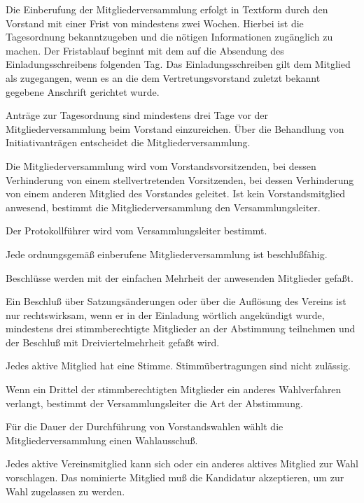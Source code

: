 \documentclass[draft]{scrartcl}
\begin{document}
\begin{contract}

Die Einberufung der Mitgliederversammlung erfolgt in Textform durch den
Vorstand mit einer Frist von mindestens zwei Wochen. Hierbei ist die
Tagesordnung bekanntzugeben und die nötigen Informationen zugänglich zu
machen. Der Fristablauf beginnt mit dem auf die Absendung des
Einladungsschreibens folgenden Tag. Das Einladungsschreiben gilt dem Mitglied
als zugegangen, wenn es an die dem Vertretungsvorstand zuletzt bekannt
gegebene Anschrift gerichtet wurde.

Anträge zur Tagesordnung sind mindestens drei Tage vor der
Mitgliederversammlung beim Vorstand einzureichen. Über die Behandlung von
Initiativanträgen entscheidet die Mitgliederversammlung.


Die Mitgliederversammlung wird vom Vorstandsvorsitzenden, bei dessen
Verhinderung von einem stellvertretenden Vorsitzenden, bei dessen Verhinderung
von einem anderen Mitglied des Vorstandes geleitet. Ist kein Vorstandsmitglied
anwesend, bestimmt die Mitgliederversammlung den Versammlungsleiter.

Der Protokollführer wird vom Versammlungsleiter bestimmt.


Jede ordnungsgemäß einberufene Mitgliederversammlung ist beschlußfähig.

Beschlüsse werden mit der einfachen Mehrheit der anwesenden Mitglieder gefaßt.

Ein Beschluß über Satzungsänderungen oder über die Auflösung des Vereins ist
nur rechtswirksam, wenn er in der Einladung wörtlich angekündigt wurde,
mindestens drei stimmberechtigte Mitglieder an der Abstimmung teilnehmen und
der Beschluß mit Dreiviertelmehrheit gefaßt wird.\label{MV-Aufloesung}


Jedes aktive Mitglied hat eine Stimme. Stimmübertragungen sind nicht
zulässig.\label{Stimmrechte}

Wenn ein Drittel der stimmberechtigten Mitglieder ein anderes
Wahlverfahren verlangt, bestimmt der Versammlungsleiter die Art der
Abstimmung.

Für die Dauer der Durchführung von Vorstandswahlen wählt die
Mitgliederversammlung einen Wahlausschuß.

Jedes aktive Vereinsmitglied kann sich oder ein anderes aktives Mitglied zur
Wahl vorschlagen. Das nominierte Mitglied muß die Kandidatur akzeptieren, um
zur Wahl zugelassen zu werden.


\end{contract}
\end{document}
